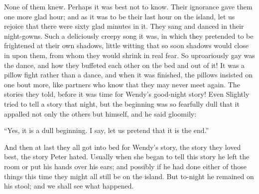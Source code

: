 None of them knew. Perhaps it was best not to know. Their ignorance
gave them one more glad hour; and as it was to be their last hour on
the island, let us rejoice that there were sixty glad minutes in it.
They sang and danced in their night-gowns. Such a deliciously creepy
song it was, in which they pretended to be frightened at their own
shadows, little witting that so soon shadows would close in upon them,
from whom they would shrink in real fear. So uproariously gay was the
dance, and how they buffeted each other on the bed and out of it! It
was a pillow fight rather than a dance, and when it was finished, the
pillows insisted on one bout more, like partners who know that they may
never meet again. The stories they told, before it was time for Wendy's
good-night story! Even Slightly tried to tell a story that night, but
the beginning was so fearfully dull that it appalled not only the
others but himself, and he said gloomily:

``Yes, it is a dull beginning. I say, let us pretend that it is the
end.''

And then at last they all got into bed for Wendy's story, the story
they loved best, the story Peter hated. Usually when she began to tell
this story he left the room or put his hands over his ears; and
possibly if he had done either of those things this time they might all
still be on the island. But to-night he remained on his stool; and we
shall see what happened.